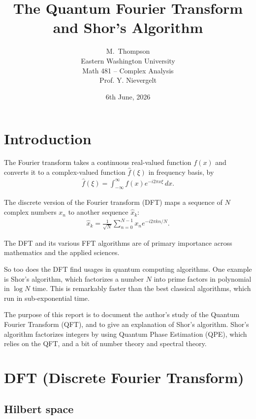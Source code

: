 \documentclass[11pt]{article}
\title{The Quantum Fourier Transform and Shor's Algorithm}
\author{M.~Thompson \\ \small Eastern Washington University \\ Math 481 -- Complex Analysis \\ Prof. Y. Nievergelt}
\date{6th June, 2026}
\begin{document}
\maketitle

\section{Introduction}

The Fourier transform takes a continuous real-valued function $f(x)$ and converts it to a complex-valued function $\hat{f}(\xi)$ in frequency basis, by
\begin{align*}
\hat{f}(\xi) = \int_{-\infty}^{\infty} f(x) e^{-i 2\pi x \xi}\, dx.
\end{align*}

The discrete version of the Fourier transform (DFT) maps a sequence of $N$ complex numbers $x_n$ to another sequence $\hat{x}_k$:
\begin{align*}
\hat{x}_k = \frac{1}{\sqrt{N}} \sum_{n=0}^{N-1} x_n e^{-i 2\pi k n / N}.
\end{align*}

The DFT and its various FFT algorithms are of primary importance across mathematics and the applied sciences.

So too does the DFT find usages in quantum computing algorithms. One example is Shor's algorithm, which factorizes a number $N$ into prime factors in polynomial in $\log N$ time. This is remarkably faster than the best classical algorithms, which run in sub-exponential time.

The purpose of this report is to document the author's study of the Quantum Fourier Transform (QFT), and to give an explanation of Shor's algorithm. Shor's algorithm factorizes integers by using Quantum Phase Estimation (QPE), which relies on the QFT, and a bit of number theory and spectral theory.

\section{DFT (Discrete Fourier Transform)}

\subsection{Hilbert space}
\end{document}

